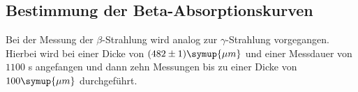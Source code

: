 \subsection{Bestimmung der Beta-Absorptionskurven}    
Bei der Messung der $\beta$-Strahlung wird analog zur $\gamma$-Strahlung vorgegangen. Hierbei wird bei einer Dicke von $(482 \pm 1) \symup{\mu m}$ 
und einer Messdauer von $1100$ s angefangen und dann zehn Messungen bis zu einer Dicke von $100 \symup{\mu m}$ durchgeführt.